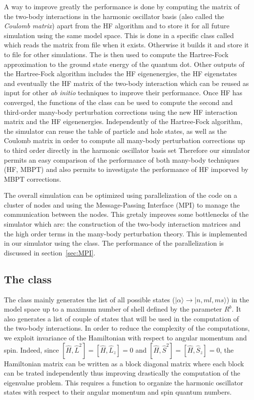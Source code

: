 A way to improve greatly the performance is done by computing the matrix of the two-body interactions in the harmonic oscillator basis (also called the \textit{Coulomb matrix}) apart from the HF algorithm and to store it for all future simulation using the same model space.
This is done in a specific class called  which reads the matrix from file when it exists. Otherwise it builds it and store it to file for other simulations. The  is then used to compute the Hartree-Fock approximation to the ground state energy of the quantum dot. Other outputs of the Hartree-Fock algorithm includes  the HF eigenenergies, the HF eigenstates and eventually  the HF matrix of the two-body interaction which can be reused as input for other \textit{ab initio} techniques to improve their performance.
Once HF has converged, the functions of the class  can be used to compute the second and third-order many-body perturbation corrections using the new HF interaction matrix and the HF eigenenergies.
Independently of the Hartree-Fock algorithm, the simulator can reuse the table of particle and hole states, as well as the Coulomb matrix in order to compute all many-body perturbation corrections up to third order directly in the harmonic oscillator basis set Therefore our simulator permits an easy comparison of the performance of both many-body techniques (HF, MBPT) and also permits to investigate the performance of HF imporved by MBPT corrections.

The overall simulation can be optimized using parallelization of the code on a cluster of nodes and using the Message-Passing Interface (MPI) to manage the communication between the nodes. This gretaly improves some bottlenecks of the simulator which are: the construction of the two-body interaction matrices and the high order terms in the many-body perturbation theory. This is implemented in our simulator using the  class. The performance of the parallelization is discussed in section~\ref{sec:MPI}.


\subsection{The  class}
The  class mainly generates the list of all possible states ($|\alpha \rangle  \rightarrow |n, ml, ms \rangle $) in the model space up to a maximum number of shell defined by the parameter $R^b$. It also generates a list of couple of states that will be used in the computation of the two-body interactions.
In order to reduce the complexity of the computations, we exploit invariance of the Hamiltonian with respect to angular momentum and spin. Indeed, since $[\hat{H},\hat{L}^2]=[\hat{H},\hat{L}_z]=0$ and $[\hat{H},\hat{S}^2]=[\hat{H},\hat{S}_z]=0$, the Hamiltonian matrix can be written as a block diagonal matrix where each block can be trated independently thus improving drastically the computation of the eigenvalue problem. This requires a function  to organize the harmonic oscillator states  with respect to their angular momentum and spin quantum numbers.

